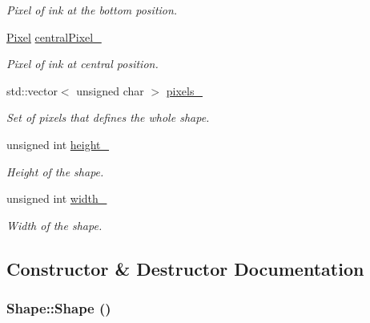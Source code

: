 \begin{CompactItemize}
\begin{CompactList}\small\item\em Pixel of ink at the bottom position. \item\end{CompactList}\item 
\hypertarget{class_shape_f66f42ad506f5c8e31f1993111ea4878}{
\hyperlink{_pixel_8hpp_535e59456e3e633842529cfa8ea103c4}{Pixel} \hyperlink{class_shape_f66f42ad506f5c8e31f1993111ea4878}{centralPixel\_\-}}
\label{class_shape_f66f42ad506f5c8e31f1993111ea4878}

\begin{CompactList}\small\item\em Pixel of ink at central position. \item\end{CompactList}\item 
\hypertarget{class_shape_4753b295c12e83195d8fd9bb6fb86ec4}{
std::vector$<$ unsigned char $>$ \hyperlink{class_shape_4753b295c12e83195d8fd9bb6fb86ec4}{pixels\_\-}}
\label{class_shape_4753b295c12e83195d8fd9bb6fb86ec4}

\begin{CompactList}\small\item\em Set of pixels that defines the whole shape. \item\end{CompactList}\item 
\hypertarget{class_shape_76354eeb3b4c5c6c9125f4195c3c274c}{
unsigned int \hyperlink{class_shape_76354eeb3b4c5c6c9125f4195c3c274c}{height\_\-}}
\label{class_shape_76354eeb3b4c5c6c9125f4195c3c274c}

\begin{CompactList}\small\item\em Height of the shape. \item\end{CompactList}\item 
\hypertarget{class_shape_863661d529942b525830d2208259583b}{
unsigned int \hyperlink{class_shape_863661d529942b525830d2208259583b}{width\_\-}}
\label{class_shape_863661d529942b525830d2208259583b}

\begin{CompactList}\small\item\em Width of the shape. \item\end{CompactList}\end{CompactItemize}


\subsection{Constructor \& Destructor Documentation}
\hypertarget{class_shape_aa8d87171e65e0d8ba3c5459978992a7}{
\subsubsection[Shape]{\setlength{\rightskip}{0pt plus 5cm}Shape::Shape ()}}
\label{class_shape_aa8d87171e65e0d8ba3c5459978992a7}


